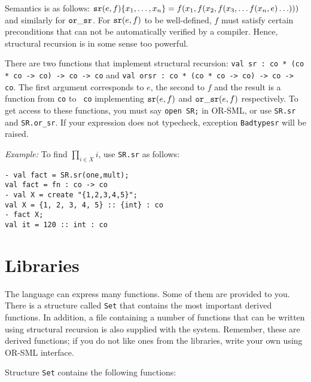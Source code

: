 Semantics is as follows: ${\tt sr}(e,f) \{x_1,\ldots,x_n\} =
f(x_1,f(x_2,f(x_3,\ldots f(x_n,e)\ldots)))$ and similarly for ${\tt or\_sr}$.
For ${\tt sr}(e,f)$ to be well-defined, $f$ must satisfy certain
preconditions that can not be automatically verified by a compiler.
Hence, structural recursion is in some sense too powerful. 

There are two functions that implement structural recursion:
{\tt val sr : co * (co * co -> co) -> co -> co} and {\tt val orsr : co
* (co * co -> co) -> co -> co}. The first argument corresponds to $e$,
the second to $f$ and the result is a function from {\tt co} to {\tt
co} implementing ${\tt sr}(e,f)$ and ${\tt or\_sr}(e,f)$ respectively. To get
access to these functions, you must say {\tt open SR;} in OR-SML, or
use {\tt SR.sr} and {\tt SR.or\_sr}. If
your expression does not typecheck, exception {\tt Badtypesr} will be
raised. 

{\em Example:} To find $\prod_{i \in X} i$, use {\tt SR.sr} as
follows: 

{\small \begin{verbatim}
- val fact = SR.sr(one,mult);
val fact = fn : co -> co
- val X = create "{1,2,3,4,5}";
val X = {1, 2, 3, 4, 5} :: {int} : co
- fact X;
val it = 120 :: int : co
\end{verbatim} }


\section{Libraries}

The language can express many functions. Some of them are provided to
you. There is a structure called {\tt Set} that contains the most
important derived functions. In addition, a file containing a number
of functions that can be written using structural recursion is also
supplied with the system.
 Remember, these are derived functions; if you do not like ones
from the libraries, write your own using OR-SML interface.

Structure {\tt Set} contains the following functions:

